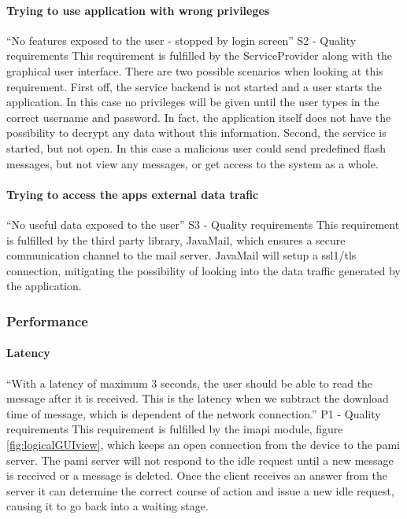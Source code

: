 \paragraph{Trying to use application with wrong privileges} \hfill
\newline
“No features exposed to the user - stopped by login screen” S2 - Quality requirements
\newline
\newline
This requirement is fulfilled by the ServiceProvider along with the graphical user interface. There are two possible scenarios when looking at this requirement. First off, the service backend is not started and a user starts the application. In this case no privileges will be given until the user types in the correct username and password. In fact, the application itself does not have the possibility to decrypt any data without this information.
Second, the service is started, but not open. In this case a malicious user could send predefined flash messages, but not view any messages, or get access to the system as a whole. 

\paragraph{Trying to access the apps external data trafic}\hfill
\newline
“No useful data exposed to the user” S3 - Quality requirements
\newline
\newline
This requirement is fulfilled by the third party library, JavaMail, which ensures a secure communication channel to the mail server. JavaMail  will setup a \gls{ssl1}/\gls{tls} connection, mitigating the possibility of looking into the data traffic generated by the application.

\subsubsection{Performance}

\paragraph{Latency}\hfill
\newline
“With a latency of maximum 3 seconds, the user should be able to read the message after it is received. This is the latency when we subtract the download time of message, which is dependent of the network connection.” P1 - Quality requirements
\newline
\newline
This requirement is fulfilled by the \gls{imapi} module, figure \ref{fig:logicalGUIview}, which keeps an open connection from the device to the \gls{pami} server. The \gls{pami} server will not respond to the \gls{idle} request until a new message is received or a message is deleted. Once the client receives an answer from the server it can determine the correct course of action and issue a new \gls{idle} request, causing it to go back into a waiting stage\cite{bib:imapi}. 
